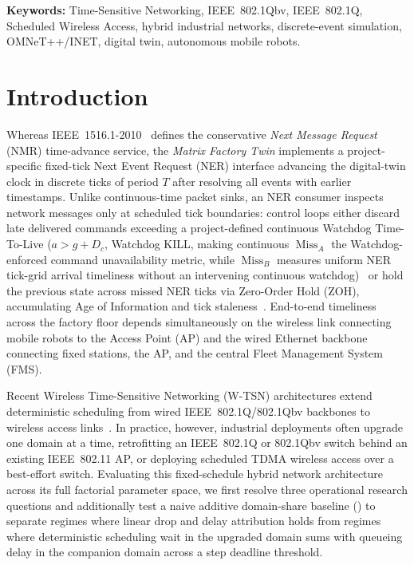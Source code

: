 \documentclass[11pt,a4paper]{article}
\newcommand{\MissA}{\ensuremath{\operatorname{Miss}_A}}
\newcommand{\MissB}{\ensuremath{\operatorname{Miss}_B}}
\begin{document}
\noindent\textbf{Keywords:} Time-Sensitive Networking, IEEE~802.1Qbv, IEEE~802.1Q, Scheduled Wireless Access, hybrid industrial networks, discrete-event simulation, OMNeT++/INET, digital twin, autonomous mobile robots.

\section{Introduction}
\label{sec:intro}

Whereas IEEE~1516.1-2010~\cite{ieee1516} defines the conservative \emph{Next Message Request} (NMR) time-advance service, the \textit{Matrix Factory Twin} implements a project-specific fixed-tick Next Event Request (NER) interface advancing the digital-twin clock in discrete ticks of period $T$ after resolving all events with earlier timestamps. Unlike continuous-time packet sinks, an NER consumer inspects network messages only at scheduled tick boundaries: control loops either discard late delivered commands exceeding a project-defined continuous Watchdog Time-To-Live ($a > g + D_c$, Watchdog KILL, making continuous $\MissA$ the Watchdog-enforced command unavailability metric, while $\MissB$ measures uniform NER tick-grid arrival timeliness without an intervening continuous watchdog)~\cite{pazzaglia2019dmac} or hold the previous state across missed NER ticks via Zero-Order Hold (ZOH), accumulating Age of Information and tick staleness~\cite{kaul2012real}. End-to-end timeliness across the factory floor depends simultaneously on the wireless link connecting mobile robots to the Access Point (AP) and the wired Ethernet backbone connecting fixed stations, the AP, and the central Fleet Management System (FMS).

Recent Wireless Time-Sensitive Networking (W-TSN) architectures extend deterministic scheduling from wired IEEE~802.1Q/802.1Qbv backbones to wireless access links~\cite{zanbouri2025survey, cavalcanti2019extending, seijo2022sharp}. In practice, however, industrial deployments often upgrade one domain at a time, retrofitting an IEEE~802.1Q or 802.1Qbv switch behind an existing IEEE~802.11 AP, or deploying scheduled TDMA wireless access over a best-effort switch. Evaluating this fixed-schedule hybrid network architecture across its full factorial parameter space, we first resolve three operational research questions and additionally test a naive additive domain-share baseline () to separate regimes where linear drop and delay attribution holds from regimes where deterministic scheduling wait in the upgraded domain sums with queueing delay in the companion domain across a step deadline threshold.
\end{document}
